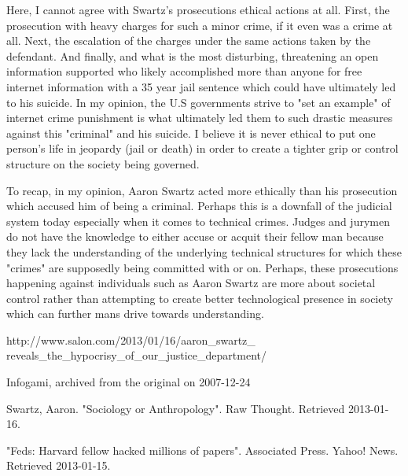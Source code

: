 \documentclass[twoside]{article}
\begin{document}
\begin{multicols}{2}
Here, I cannot agree with Swartz's prosecutions ethical actions at all. First, the prosecution with heavy charges for such a minor crime, if it even was a crime at all. Next, the escalation of the charges under the same actions taken by the defendant. And finally, and what is the most disturbing, threatening an open information supported who likely accomplished more than anyone for free internet information with a 35 year jail sentence which could have ultimately led to his suicide. In my opinion, the U.S governments strive to "set an example" of internet crime punishment is what ultimately led them to such drastic measures against this "criminal" and his suicide. I believe it is never ethical to put one person's life in jeopardy (jail or death) in order to create a tighter grip or control structure on the society being governed. 

To recap, in my opinion, Aaron Swartz acted more ethically than his prosecution which accused him of being a criminal. Perhaps this is a downfall of the judicial system today especially when it comes to technical crimes. Judges and jurymen do not have the knowledge to either accuse or acquit their fellow man because they lack the understanding of the underlying technical structures for which these "crimes" are supposedly being committed with or on. Perhaps, these prosecutions happening against individuals such as Aaron Swartz are more about societal control rather than attempting to create better technological presence in society which can further mans drive towards understanding.


\begin{thebibliography}{99} %

\bibitem{}
http://www.salon.com/2013/01/16/aaron\_swartz\_
reveals\_the\_hypocrisy\_of\_our\_justice\_department/ 

\bibitem{}
Infogami, archived from the original on 2007-12-24

\bibitem{}
Swartz, Aaron. "Sociology or Anthropology". Raw Thought. Retrieved 2013-01-16.

\bibitem{}
"Feds: Harvard fellow hacked millions of papers". Associated Press. Yahoo! News. Retrieved 2013-01-15.
 
\end{thebibliography}


\end{multicols}
\end{document}
